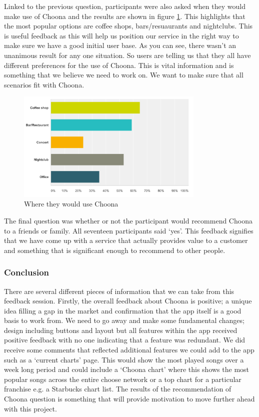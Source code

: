 Linked to the previous question, participants were also asked when they would make use of Choona and the results are shown in figure \ref{fig:where}.  This highlights that the most popular options are coffee shops, bars/resuaurants and nightclubs.  This is useful feedback as this will help us position our service in the right way to make sure we have a good initial user base.  As you can see, there wasn't an unanimous result for any one situation.  So users are telling us that they all have different preferences for the use of Choona.  This is vital information and is something that we believe we need to work on.  We want to make sure that all scenarios fit with Choona.  \\

    \begin{figure}[h!]
      \centering
      \includegraphics[width=0.8\textwidth]{./img/use_situation.png}
      \caption{Where they would use Choona}
      \label{fig:where}
    \end{figure}

The final question was whether or not the participant would recommend Choona to a friends or family.  All seventeen participants said `yes'.  This feedback signifies that we have come up with a service that actually provides value to a customer and something that is significant enough to recommend to other people.  

\subsubsection{Conclusion}
There are several different pieces of information that we can take from this feedback session.  Firstly, the overall feedback about Choona is positive; a unique idea filling a gap in the market and confirmation that the app itself is a good basis to work from.  We need to go away and make some fundamental changes; design including buttons and layout but all features within the app received positive feedback with no one indicating that a feature was redundant.  We did receive some comments that reflected additional features we could add to the app such as a `current charts' page.  This would show the most played songs over a week long period and could include a `Choona chart' where this shows the most popular songs across the entire choose network or a top chart for a particular franchise e.g. a Starbucks chart list.  The results of the recommendation of Choona question is something that will provide motivation to move further ahead with this project.

